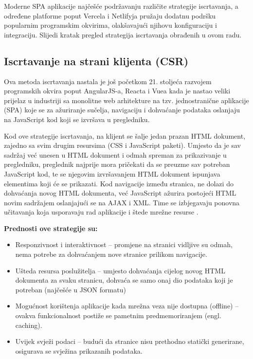 \bigskip

Moderne SPA aplikacije najčešće  podržavanju različite strategije iscrtavanja, a određene platforme poput Vercela i
Netlifyja pružaju dodatnu podršku popularnim programskim okvirima, olakšavajući njihovu konfiguraciju i integraciju. Slijedi kratak pregled strategija iscrtavanja obrađenih u ovom radu.

\subsection{Iscrtavanje na strani klijenta (CSR)}

Ova metoda iscrtavanja nastala je još početkom 21. stoljeća razvojem programskih okvira poput AngularJS-a, Reacta i Vuea kada je nastao veliki prijelaz u industriji sa monolitne web arhitekture na tzv. jednostranične aplikacije (SPA) koje se za ažuriranje sučelja, navigaciju i dohvaćanje podataka oslanjaju na JavaScript kod koji se izvršava u pregledniku.

\bigskip

Kod ove strategije iscrtavanja, na klijent se šalje jedan prazan HTML dokument, zajedno sa svim drugim resursima (CSS i JavaScript paketi). Umjesto da je sav sadržaj već unesen u HTML dokument i odmah spreman za prikazivanje u pregledniku, preglednik najprije mora pričekati da se preuzme sav potreban JavaScript kod, te se njegovim izvršavanjem HTML dokument ispunjava elementima koji će se prikazati. Kod navigacije između stranica, ne dolazi do dohvaćanja novog HTML dokumenta, već JavaScript ažurira postojeći HTML novim sadržajem oslanjajući se na AJAX i XML. Time se izbjegavaju ponovna učitavanja koja usporavaju rad aplikacije i štede mrežne resurse \cite{beran2023usporedba}.

\bigskip

\textbf{Prednosti ove strategije su:}

\begin{itemize}
    \item Responzivnost i interaktivnost – promjene na stranici vidljive su odmah, nema potrebe za dohvaćanjem nove stranice prilikom navigacije.
    \item Ušteda resursa poslužitelja – umjesto dohvaćanja cijelog novog HTML dokumenta za svaku stranicu, dohvaća se samo onaj dio podataka koji je potreban (najčešće u JSON formatu)
    \item Mogućnost korištenja aplikacije kada mrežna veza nije dostupna (offline) – ovakva funkcionalnost postiže se pametnim predmemoriranjem (engl. caching).
    \item Uvijek svježi podaci – budući da stranice nisu prethodno statički generirane, osigurava se svježina prikazanih podataka.
\end{itemize}

